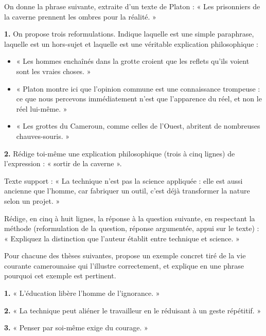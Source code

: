 \documentclass[11pt]{article}
\newcounter{popsec}
\newcounter{popsub}
\newcommand{\courssub}[1]{%
  \stepcounter{popsub}%
  \par\vspace{9pt}\noindent{\popxbold\fontsize{11.5}{13}\selectfont\color{popink}{\color{poporange}\thepopsec.\thepopsub}\hspace{6pt}#1}\par\nopagebreak\vspace{4pt}
}
\begin{document}
\courssub{Je m'entraîne}

\begin{exercice}
On donne la phrase suivante, extraite d'un texte de Platon : « Les prisonniers de la caverne prennent les ombres pour la réalité. »

\textbf{1.} On propose trois reformulations. Indique laquelle est une simple paraphrase, laquelle est un hors-sujet et laquelle est une véritable explication philosophique :
\begin{itemize}
\item[a)] « Les hommes enchaînés dans la grotte croient que les reflets qu'ils voient sont les vraies choses. »
\item[b)] « Platon montre ici que l'opinion commune est une connaissance trompeuse : ce que nous percevons immédiatement n'est que l'apparence du réel, et non le réel lui-même. »
\item[c)] « Les grottes du Cameroun, comme celles de l'Ouest, abritent de nombreuses chauves-souris. »
\end{itemize}

\textbf{2.} Rédige toi-même une explication philosophique (trois à cinq lignes) de l'expression : « sortir de la caverne ».
\end{exercice}

\begin{exercice}
Texte support : « La technique n'est pas la science appliquée : elle est aussi ancienne que l'homme, car fabriquer un outil, c'est déjà transformer la nature selon un projet. »

Rédige, en cinq à huit lignes, la réponse à la question suivante, en respectant la méthode (reformulation de la question, réponse argumentée, appui sur le texte) : « Expliquez la distinction que l'auteur établit entre technique et science. »
\end{exercice}

\begin{exercice}
Pour chacune des thèses suivantes, propose un exemple concret tiré de la vie courante camerounaise qui l'illustre correctement, et explique en une phrase pourquoi cet exemple est pertinent.

\textbf{1.} « L'éducation libère l'homme de l'ignorance. »

\textbf{2.} « La technique peut aliéner le travailleur en le réduisant à un geste répétitif. »

\textbf{3.} « Penser par soi-même exige du courage. »
\end{exercice}
\end{document}

